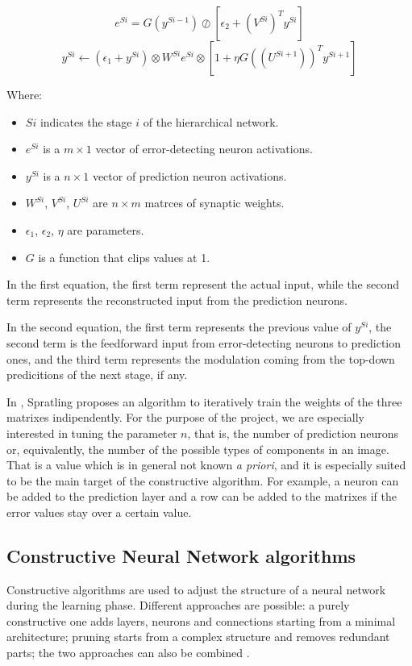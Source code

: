 \documentclass[a4paper,12pt]{article}
\begin{document}
		$$e^{Si} = G(y^{Si-1}) \oslash [\epsilon_2 + (V^{Si})^T y^{Si}]$$
		$$y^{Si} \leftarrow (\epsilon_1 + y^{Si}) \otimes W^{Si}e^{Si} \otimes [1 + \eta G((U^{Si+1}))^T y^{Si+1}]$$
		
		Where:
		\begin{itemize}
			\item $Si$ indicates the stage $i$ of the hierarchical network.
			\item $e^{Si}$ is a $m \times 1$ vector of error-detecting neuron activations.
			\item $y^{Si}$ is a $n \times 1$ vector of prediction neuron activations.
			\item $W^{Si}$, $V^{Si}$, $U^{Si}$ are $n \times m$ matrces of synaptic weights.
			\item $\epsilon_1$, $\epsilon_2$, $\eta$ are parameters.
			\item $G$ is a function that clips values at 1. 
		\end{itemize}
		
		In the first equation, the first term represent the actual input, while the second term represents the reconstructed input from the prediction neurons.
		
		In the second equation, the first term represents the previous value of $y^{Si}$, the second term is the feedforward input from error-detecting neurons to prediction ones, and
		the third term represents the modulation coming from the top-down predicitions of the next stage, if any.
		
		In \cite{spratling2012unsupervised}, Spratling proposes an algorithm to iteratively train the weights of the three matrixes indipendently. For the purpose
		of the project, we are especially interested in tuning the parameter $n$, that is, the number of prediction neurons or, equivalently, the number of
		the possible types of components in an image. That is a value which is in general not known \emph{a priori}, and it is especially suited to be
		the main target of the constructive algorithm. For example, a neuron can be added to the prediction layer and a row can be added to the matrixes
		if the error values stay over a certain value.
		
	\subsection{Constructive Neural Network algorithms}
		Constructive algorithms are used to adjust the structure of a neural network during the learning phase.
		Different approaches are possible: a purely constructive one adds layers, neurons and connections starting from a minimal architecture; pruning
		starts from a complex structure and removes redundant parts; the two approaches can also be combined \cite{parekh2000constructive}.
		
\end{document}
